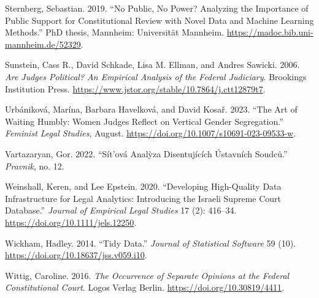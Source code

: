 \documentclass[
  11pt,
]{article}
\newlength{\cslhangindent}
\newenvironment{CSLReferences}[2] %
 {\begin{list}{}{%
  \setlength{\itemindent}{0pt}
  \setlength{\leftmargin}{0pt}
  \setlength{\parsep}{0pt}
  \ifodd #1
   \setlength{\leftmargin}{\cslhangindent}
   \setlength{\itemindent}{-1\cslhangindent}
  \fi
  \setlength{\itemsep}{#2\baselineskip}}}
 {\end{list}}
\begin{document}
\begin{CSLReferences}{1}{0}
Sternberg, Sebastian. 2019. {``No Public, No Power? {Analyzing} the Importance of Public Support for Constitutional Review with Novel Data and Machine Learning Methods.''} PhD thesis, Mannheim: Universität Mannheim. \url{https://madoc.bib.uni-mannheim.de/52329}.

Sunstein, Cass R., David Schkade, Lisa M. Ellman, and Andres Sawicki. 2006. \emph{Are {Judges Political}? {An Empirical Analysis} of the {Federal Judiciary}}. Brookings Institution Press. \url{https://www.jstor.org/stable/10.7864/j.ctt12879t7}.

Urbániková, Marína, Barbara Havelková, and David Kosař. 2023. {``The {Art} of {Waiting Humbly}: {Women Judges Reflect} on {Vertical Gender Segregation}.''} \emph{Feminist Legal Studies}, August. \url{https://doi.org/10.1007/s10691-023-09533-w}.

Vartazaryan, Gor. 2022. {``Sít'ová Analỳza Disentujících Ústavních Soudců.''} \emph{Pravnik}, no. 12.

Weinshall, Keren, and Lee Epstein. 2020. {``Developing {High-Quality Data Infrastructure} for {Legal Analytics}: {Introducing} the {Israeli Supreme Court Database}.''} \emph{Journal of Empirical Legal Studies} 17 (2): 416--34. \url{https://doi.org/10.1111/jels.12250}.

Wickham, Hadley. 2014. {``Tidy {Data}.''} \emph{Journal of Statistical Software} 59 (10). \url{https://doi.org/10.18637/jss.v059.i10}.

Wittig, Caroline. 2016. \emph{The {Occurrence} of {Separate Opinions} at the {Federal Constitutional Court}}. Logos Verlag Berlin. \url{https://doi.org/10.30819/4411}.

\end{CSLReferences}
\end{document}
